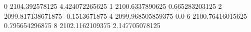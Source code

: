 0 2104.392578125 4.424072265625
1 2100.6337890625 0.665283203125
2 2099.817138671875 -0.1513671875
4 2099.968505859375 0.0
6 2100.76416015625 0.795654296875
8 2102.1162109375 2.147705078125
